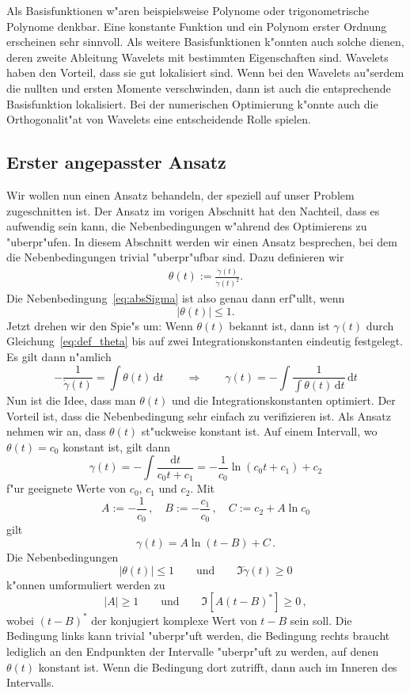 \documentclass[a4paper]{scrartcl}
\newcommand{\de}{{\mathrm{d}}}
\begin{document}
Als Basisfunktionen w"aren beispielsweise Polynome oder trigonometrische Polynome denkbar. 
Eine konstante Funktion und ein Polynom erster Ordnung erscheinen sehr sinnvoll. 
Als weitere Basisfunktionen k"onnten auch solche dienen, deren zweite Ableitung Wavelets mit bestimmten Eigenschaften sind. 
Wavelets haben den Vorteil, dass sie gut lokalisiert sind. 
Wenn bei den Wavelets au"serdem die nullten und ersten Momente verschwinden, dann ist auch die entsprechende Basisfunktion lokalisiert. 
Bei der numerischen Optimierung k"onnte auch die Orthogonalit"at von Wavelets eine entscheidende Rolle spielen. 


\subsection{Erster angepasster Ansatz}

Wir wollen nun einen Ansatz behandeln, der speziell auf unser Problem zugeschnitten ist. 
Der Ansatz im vorigen Abschnitt hat den Nachteil, dass es aufwendig sein kann, die Nebenbedingungen w"ahrend des Optimierens zu "uberpr"ufen. 
In diesem Abschnitt werden wir einen Ansatz besprechen, bei dem die Nebenbedingungen trivial "uberpr"ufbar sind. 
Dazu definieren wir
\begin{align} \label{eq:def_theta} 
\theta(t) := \frac{\ddot\gamma(t)}{\dot\gamma(t)^2}. 
\end{align}
Die Nebenbedingung~\eqref{eq:absSigma} ist also genau dann erf"ullt, wenn 
$$ |\theta(t)| \le 1. $$
Jetzt drehen wir den Spie"s um: Wenn $\theta(t)$ bekannt ist, dann ist $\gamma(t)$ durch Gleichung~\eqref{eq:def_theta} bis auf zwei Integrationskonstanten eindeutig festgelegt. 
Es gilt dann n"amlich 
$$ -\frac{1}{\dot\gamma(t)} = \int\theta(t)\,\de t 
\qquad \Longrightarrow \qquad 
\gamma(t) = -\int \frac{1}{\int\theta(t)\,\de t}\,\de t $$
Nun ist die Idee, dass man $\theta(t)$ und die Integrationskonstanten optimiert. 
Der Vorteil ist, dass die Nebenbedingung sehr einfach zu verifizieren ist. 
Als Ansatz nehmen wir an, dass $\theta(t)$ st"uckweise konstant ist. 
Auf einem Intervall, wo $\theta(t)=c_0$ konstant ist, gilt dann 
$$ \gamma(t) = -\int \frac{\de t}{c_0t + c_1}
=-\frac{1}{c_0}\ln(c_0t+c_1) + c_2 $$
f"ur geeignete Werte von $c_0$, $c_1$ und $c_2$. Mit 
$$ A := -\frac{1}{c_0}\,, \quad
B:= -\frac{c_1}{c_0}\,, \quad
C:= c_2 + A\ln c_0 $$
gilt 
$$ \gamma(t) = A\ln(t-B) + C\,. $$
Die Nebenbedingungen 
$$ |\theta(t)| \le 1 \qquad \text{und} \qquad
\Im\dot\gamma(t)\ge 0 $$
k"onnen umformuliert werden zu
$$ |A|\ge 1 \qquad \text{und}\qquad
\Im\left[A(t-B)^*\right]\ge 0\,, $$
wobei $(t-B)^*$ der konjugiert komplexe Wert von $t-B$ sein soll. 
Die Bedingung links kann trivial "uberpr"uft werden, die Bedingung rechts braucht lediglich an den Endpunkten der Intervalle "uberpr"uft zu werden, auf denen $\theta(t)$ konstant ist. 
Wenn die Bedingung dort zutrifft, dann auch im Inneren des Intervalls. 
\end{document}
